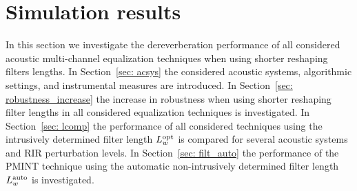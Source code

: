 \documentclass[twocolumn]{bmcart}%
\begin{document}
\section{Simulation results}
\label{sec: exp}
In this section we investigate the dereverberation performance of all considered acoustic multi-channel equalization techniques when using shorter reshaping filters lengths.
In Section~\ref{sec: acsys} the considered acoustic systems, algorithmic settings, and instrumental measures are introduced.
In Section~\ref{sec: robustness_increase} the increase in robustness when using shorter reshaping filter lengths in all considered equalization techniques is investigated.
In Section~\ref{sec: lcomp} the performance of all considered techniques using the intrusively determined filter length $L^{\rm opt}_w$ is compared for several acoustic systems and RIR perturbation levels.
In Section~\ref{sec: filt_auto} the performance of the PMINT technique using the automatic non-intrusively determined filter length $L^{\rm auto}_w$ is investigated.
\end{document}
